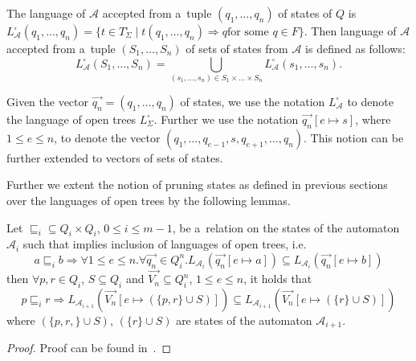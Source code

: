 The language of $\mathcal{A}$ accepted from a~tuple $(q_1,\ldots,q_n)$ of states
of $Q$ is $L^\square_\mathcal{A}(q_1,\ldots,q_n) = \{t \in T^\square_\Sigma
\mid t(q_1,\ldots,q_n) \Longrightarrow q \text{for some } q \in F\}$. Then
language of $\mathcal{A}$ accepted from a~tuple $(S_1,\ldots,S_n)$ of sets of
states from $\mathcal{A}$ is defined as
follows:
\begin{equation}
L_\mathcal{A}^\square(S_1,\ldots,S_n) = \bigcup_{(s_1,\ldots,s_n) \in
S_1\times\ldots\times S_n} L_\mathcal{A}^\square(s_1,\ldots,s_n).
\end{equation}

Given the vector $\overset{\rightarrow}{q_n} = (q_1,\ldots,q_n)$ of states, we
use the notation $L_\mathcal{A}^\square$ to denote the language of open trees
$L_\Sigma^\square$. Further we use the notation $\overset{\rightarrow}{q_n}[e
\mapsto s]$, where $1 \leq e \leq n$, to denote the vector
$(q_1,\ldots,q_{e-1}, s, q_{e+1},\ldots,q_n)$. This notion can be further
extended to vectors of sets of states.

Further we extent the notion of pruning states as defined in previous sections
over the languages of open trees by the following lemmas.

\begin{lemma}
Let $\sqsubseteq_i \subseteq Q_i \times Q_i$, $0 \leq i \leq m-1$, be a~relation
on the states of the automaton $\mathcal{A}_i$ such that implies inclusion of
languages of open trees, i.e.
\begin{equation}
 a \sqsubseteq_i b \Rightarrow \forall 1 \leq e \leq n. \forall
 \overset{\rightarrow}{q_n} \in Q_i^n.
 L_{\mathcal{A}_{i}}(\overset{\rightarrow}{q_n}[e \mapsto a]) \subseteq
 L_{\mathcal{A}_{i}}(\overset{\rightarrow}{q_n}[e \mapsto b])
\end{equation}
then $\forall p, r \in Q_i$, $S \subseteq Q_i$ and $\overset{\rightarrow}{V_n}
\subseteq Q^n_i$, $1 \leq e \leq n$, it holds that
\begin{equation}
 p \sqsubseteq_i r \Rightarrow
 L_{\mathcal{A}_{i+1}}(\overset{\rightarrow}{V_n}[e \mapsto (\{p, r\} \cup S)])
 \subseteq  L_{\mathcal{A}_{i+1}}(\overset{\rightarrow}{V_n}[e \mapsto (\{r\}
 \cup S)])
\end{equation}
where $(\{p, r,\} \cup S)$, $(\{r\} \cup S)$ are states of the automaton
$\mathcal{A}_{i+1}$.
\end{lemma}

\begin{proof}
Proof can be found in~\cite{tacas}.
\end{proof}

